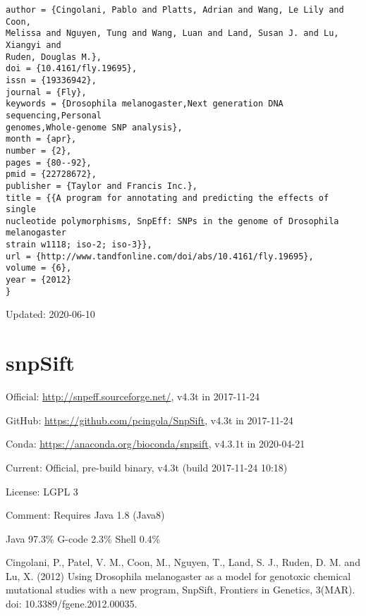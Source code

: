\documentclass[]{article}
\begin{document}
\begin{verbatim}
author = {Cingolani, Pablo and Platts, Adrian and Wang, Le Lily and Coon,
Melissa and Nguyen, Tung and Wang, Luan and Land, Susan J. and Lu, Xiangyi and
Ruden, Douglas M.},
doi = {10.4161/fly.19695},
issn = {19336942},
journal = {Fly},
keywords = {Drosophila melanogaster,Next generation DNA sequencing,Personal
genomes,Whole-genome SNP analysis},
month = {apr},
number = {2},
pages = {80--92},
pmid = {22728672},
publisher = {Taylor and Francis Inc.},
title = {{A program for annotating and predicting the effects of single
nucleotide polymorphisms, SnpEff: SNPs in the genome of Drosophila melanogaster
strain w1118; iso-2; iso-3}},
url = {http://www.tandfonline.com/doi/abs/10.4161/fly.19695},
volume = {6},
year = {2012}
}
\end{verbatim}

Updated: 2020-06-10

\section{snpSift}

Official: \url{http://snpeff.sourceforge.net/}, v4.3t in 2017-11-24

GitHub: \url{https://github.com/pcingola/SnpSift}, v4.3t in 2017-11-24

Conda: \url{https://anaconda.org/bioconda/snpsift}, v4.3.1t in 2020-04-21

Current: Official, pre-build binary, v4.3t (build 2017-11-24 10:18)

License: LGPL 3

Comment: Requires Java 1.8 (Java8)

Java 97.3\% G-code 2.3\% Shell 0.4\%

Cingolani, P., Patel, V. M., Coon, M., Nguyen, T., Land, S. J., Ruden, D. M. and Lu, X. (2012) Using Drosophila melanogaster as a model for genotoxic chemical mutational studies with a new program, SnpSift, Frontiers in Genetics, 3(MAR). doi: 10.3389/fgene.2012.00035.
\end{document}
